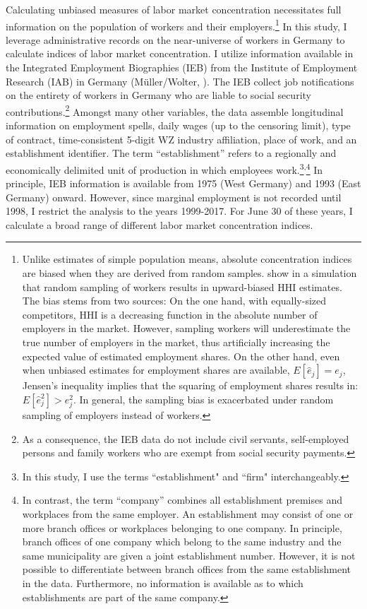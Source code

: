 \documentclass[11pt,oneside,reqno,xcolor=dvipsnames]{article} %
\newcommand\fnsep{\textsuperscript{,}} %
\begin{document}
Calculating unbiased measures of labor market concentration necessitates full information on the population of workers and their employers.\footnote{Unlike estimates of simple population means, absolute concentration indices are biased when they are derived from random samples. \citet{AbelEtAl2018} show in a simulation that random sampling of workers results in upward-biased HHI estimates. The bias stems from two sources: On the one hand, with equally-sized competitors, HHI is a decreasing function in the absolute number of employers in the market. However, sampling workers will underestimate the true number of employers in the market, thus artificially increasing the expected value of estimated employment shares. On the other hand, even when unbiased estimates for employment shares are available, $E[\hat{e}_{j}]=e_{j}$, Jensen's inequality implies that the squaring of employment shares results in: $ E[\hat{e}^{2}_{j}]>e_{j}^{2} $. In general, the sampling bias is exacerbated under random sampling of employers instead of workers.} In this study, I leverage administrative records on the near-universe of workers in Germany to calculate indices of labor market concentration. I utilize information available in the Integrated Employment Biographies (IEB) from the Institute of Employment Research (IAB) in Germany (Müller/Wolter, \citeyear{MuellerWolter2020}). The IEB collect job notifications on the entirety of workers in Germany who are liable to social security contributions.\footnote{As a consequence, the IEB data do not include civil servants, self-employed persons and family workers who are exempt from social security payments.} Amongst many other variables, the data assemble longitudinal information on employment spells, daily wages (up to the censoring limit), type of contract, time-consistent 5-digit WZ industry affiliation, place of work, and an establishment identifier. The term ``establishment'' refers to a regionally and economically delimited unit of production in which employees work.\footnote{In this study, I use the terms ``establishment" and ``firm" interchangeably.}\fnsep\footnote{In contrast, the term ``company'' combines all establishment premises and workplaces from the same employer. An establishment may consist of one or more branch offices or workplaces belonging to one company. In principle, branch offices of one company which belong to the same industry and the same municipality are given a joint establishment number. However, it is not possible to differentiate between branch offices from the same establishment in the data. Furthermore, no information is available as to which establishments are part of the same company.} In principle, IEB information is available from 1975 (West Germany) and 1993 (East Germany) onward. However, since marginal employment is not recorded until 1998, I restrict the analysis to the years 1999-2017. For June 30 of these years, I calculate a broad range of different labor market concentration indices.
\end{document}
